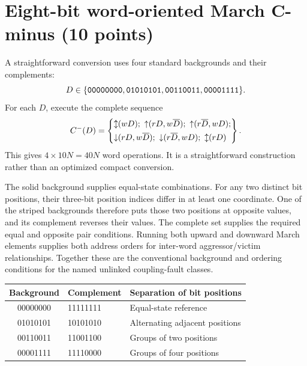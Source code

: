 \section{Eight-bit word-oriented March C-minus (10 points)}
\answer A straightforward conversion uses four standard backgrounds and their complements:
\[
D\in\{\texttt{00000000},\texttt{01010101},\texttt{00110011},\texttt{00001111}\}.
\]
For each $D$, execute the complete sequence
\[
C^-(D)=\left\{\begin{aligned}
&\mathord{\updownarrow}(wD);\ \mathord{\uparrow}(rD,w\overline D);\ \mathord{\uparrow}(r\overline D,wD);\\
&\mathord{\downarrow}(rD,w\overline D);\ \mathord{\downarrow}(r\overline D,wD);\ \mathord{\updownarrow}(rD)
\end{aligned}\right\}.
\]
This gives $4\times10N=40N$ word operations. It is a straightforward construction rather than an optimized compact conversion.

The solid background supplies equal-state combinations. For any two distinct bit positions, their three-bit position indices differ in at least one coordinate. One of the striped backgrounds therefore puts those two positions at opposite values, and its complement reverses their values. The complete set supplies the required equal and opposite pair conditions. Running both upward and downward March elements supplies both address orders for inter-word aggressor/victim relationships. Together these are the conventional background and ordering conditions for the named unlinked coupling-fault classes.

\begin{center}
\begin{tabular}{cll}
\toprule Background & Complement & Separation of bit positions\\\midrule
00000000&11111111&Equal-state reference\\
01010101&10101010&Alternating adjacent positions\\
00110011&11001100&Groups of two positions\\
00001111&11110000&Groups of four positions\\
\bottomrule
\end{tabular}
\end{center}

